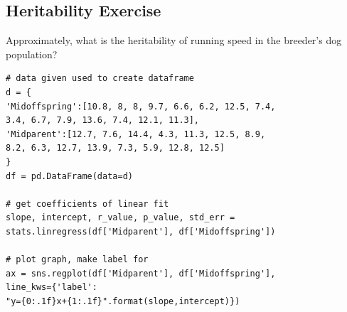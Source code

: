 \documentclass[12pt,a4paper]{article}
\begin{document}
\subsection{Heritability Exercise}
\begin{enumerate}
    {\color{G-Moon}\item Approximately, what is the heritability of running speed in the breeder’s dog population?}
{\small\begin{lstlisting}
# data given used to create dataframe
d = {
'Midoffspring':[10.8, 8, 8, 9.7, 6.6, 6.2, 12.5, 7.4,
3.4, 6.7, 7.9, 13.6, 7.4, 12.1, 11.3], 
'Midparent':[12.7, 7.6, 14.4, 4.3, 11.3, 12.5, 8.9,
8.2, 6.3, 12.7, 13.9, 7.3, 5.9, 12.8, 12.5]
}
df = pd.DataFrame(data=d)

# get coefficients of linear fit
slope, intercept, r_value, p_value, std_err = 
stats.linregress(df['Midparent'], df['Midoffspring'])

# plot graph, make label for
ax = sns.regplot(df['Midparent'], df['Midoffspring'], 
line_kws={'label':
"y={0:.1f}x+{1:.1f}".format(slope,intercept)})


\end{lstlisting}}
\end{enumerate}
\end{document}
